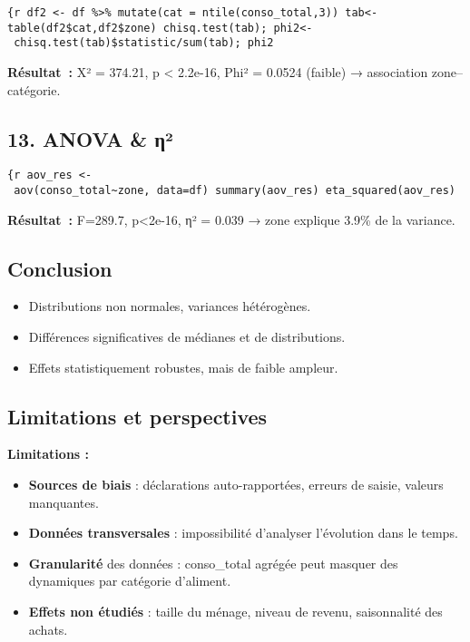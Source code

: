 \documentclass[
]{article}
\providecommand{\tightlist}{%
  \setlength{\itemsep}{0pt}\setlength{\parskip}{0pt}}
\begin{document}
\texttt{\{r\ df2\ \textless{}-\ df\ \%\textgreater{}\%\ mutate(cat\ =\ ntile(conso\_total,3))\ tab\textless{}-table(df2\$cat,df2\$zone)\ chisq.test(tab);\ phi2\textless{}-\ chisq.test(tab)\$statistic/sum(tab);\ phi2}

\textbf{Résultat~:} X² = 374.21, p \textless{} 2.2e-16, Phi² = 0.0524
(faible) → association zone--catégorie.

\subsection{13. ANOVA \& η²}\label{anova-ux3b7uxb2}

\texttt{\{r\ aov\_res\ \textless{}-\ aov(conso\_total\textasciitilde{}zone,\ data=df)\ summary(aov\_res)\ eta\_squared(aov\_res)}

\textbf{Résultat~:} F=289.7, p\textless2e-16, η² = 0.039 → zone explique
3.9\% de la variance.

\subsection{Conclusion}\label{conclusion}

\begin{itemize}
\tightlist
\item
  Distributions non normales, variances hétérogènes.
\item
  Différences significatives de médianes et de distributions.
\item
  Effets statistiquement robustes, mais de faible ampleur.
\end{itemize}

\subsection{Limitations et
perspectives}\label{limitations-et-perspectives}

\textbf{Limitations :}

\begin{itemize}
\tightlist
\item
  \textbf{Sources de biais} : déclarations auto-rapportées, erreurs de
  saisie, valeurs manquantes.
\item
  \textbf{Données transversales} : impossibilité d'analyser l'évolution
  dans le temps.
\item
  \textbf{Granularité} des données : conso\_total agrégée peut masquer
  des dynamiques par catégorie d'aliment.
\item
  \textbf{Effets non étudiés} : taille du ménage, niveau de revenu,
  saisonnalité des achats.
\end{itemize}
\end{document}
